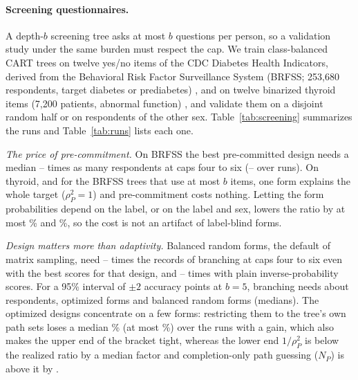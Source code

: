 \paragraph{Screening questionnaires.}
A depth-$b$ screening tree asks at most $b$ questions per person, so a validation study under the same burden must respect the cap. We train class-balanced CART trees on twelve yes/no items of the CDC Diabetes Health Indicators, derived from the Behavioral Risk Factor Surveillance System (BRFSS; 253,680 respondents, target diabetes or prediabetes) \citep{cdcdiabetes2017}, and on twelve binarized thyroid items (7,200 patients, abnormal function) \citep{quinlan1986thyroid}, and validate them on a disjoint random half or on respondents of the other sex. Table~\ref{tab:screening} summarizes the runs and Table~\ref{tab:runs} lists each one.

\emph{The price of pre-commitment.} On BRFSS the best pre-committed design needs a median \nScreenBestLo--\nScreenBestHi{} times as many respondents at caps four to six (\nScreenRunLo--\nScreenRunHi{} over runs). On thyroid, and for the BRFSS trees that use at most $b$ items, one form explains the whole target ($\rho_P^2=1$) and pre-commitment costs nothing. Letting the form probabilities depend on the label, or on the label and sex, lowers the ratio by at most \nLabelMax\% and \nStratMax\%, so the cost is not an artifact of label-blind forms.

\emph{Design matters more than adaptivity.} Balanced random forms, the default of matrix sampling, need \nUnifLo--\nUnifHi{} times the records of branching at caps four to six even with the best scores for that design, and \nUnifHtLo--\nUnifHtHi{} times with plain inverse-probability scores. For a 95\% interval of $\pm2$ accuracy points at $b=5$, branching needs about \nSsBranch{} respondents, optimized forms \nSsFixed{} and balanced random forms \nSsUnif{} (medians). The optimized designs concentrate on a few forms: restricting them to the tree's own path sets loses a median \nPsGapMed\% (at most \nPsGapMax\%) over the \nPsGapN{} runs with a gain, which also makes the upper end of the bracket tight, whereas the lower end $1/\rho_P^2$ is below the realized ratio by a median factor \nLowUnder{} and completion-only path guessing ($N_P$) is above it by \nNpOver.

